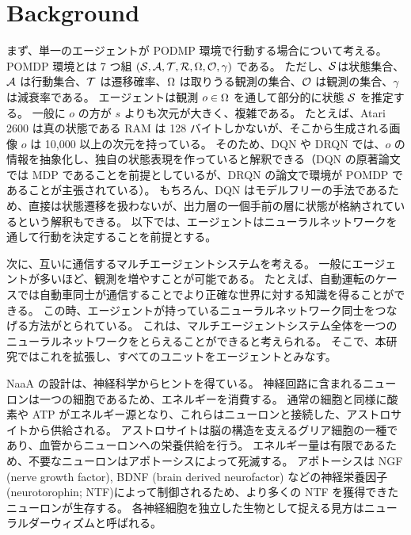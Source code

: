 \section{Background}
まず、単一のエージェントが PODMP 環境で行動する場合について考える。
POMDP 環境とは 7 つ組 $(\S, \A, \Trans, \R, \Observations, \ObProb, \gamma)$ である。
ただし、$\S$は状態集合、$\A$ は行動集合、$\Trans$ は遷移確率、$\Observations$ は取りうる観測の集合、$\ObProb$ は観測の集合、$\gamma$ は減衰率である。
エージェントは観測 $o \in \Observations$ を通して部分的に状態 $\S$ を推定する。
一般に $o$ の方が $s$ よりも次元が大きく、複雑である。
たとえば、Atari 2600 は真の状態である RAM は 128 バイトしかないが、そこから生成される画像 $o$ は 10,000 以上の次元を持っている。
そのため、DQN や DRQN では、$o$ の情報を抽象化し、独自の状態表現を作っていると解釈できる（DQN の原著論文では MDP であることを前提としているが、DRQN の論文で環境が POMDP であることが主張されている）。
もちろん、DQN はモデルフリーの手法であるため、直接は状態遷移を扱わないが、出力層の一個手前の層に状態が格納されているという解釈もできる\citep{zahavy2016graying}。
以下では、エージェントはニューラルネットワークを通して行動を決定することを前提とする。

次に、互いに通信するマルチエージェントシステムを考える。
一般にエージェントが多いほど、観測を増やすことが可能である。
たとえば、自動運転のケースでは自動車同士が通信することでより正確な世界に対する知識を得ることができる。
この時、エージェントが持っているニューラルネットワーク同士をつなげる方法がとられている\citep{sukhbaatar2016learning}。
これは、マルチエージェントシステム全体を一つのニューラルネットワークをとらえることができると考えられる。
そこで、本研究ではこれを拡張し、すべてのユニットをエージェントとみなす。


NaaA の設計は、神経科学からヒントを得ている。
神経回路に含まれるニューロンは一つの細胞であるため、エネルギーを消費する。
通常の細胞と同様に酸素や ATP がエネルギー源となり、これらはニューロンと接続した、アストロサイトから供給される。
アストロサイトは脳の構造を支えるグリア細胞の一種であり、血管からニューロンへの栄養供給を行う。
エネルギー量は有限であるため、不要なニューロンはアポトーシスによって死滅する。
アポトーシスは NGF (nerve growth factor), BDNF (brain derived neurofactor) などの神経栄養因子(neurotorophin; NTF)によって制御されるため、より多くの NTF を獲得できたニューロンが生存する。
各神経細胞を独立した生物として捉える見方はニューラルダーウィズム\citep{edelman1987neural}と呼ばれる。

